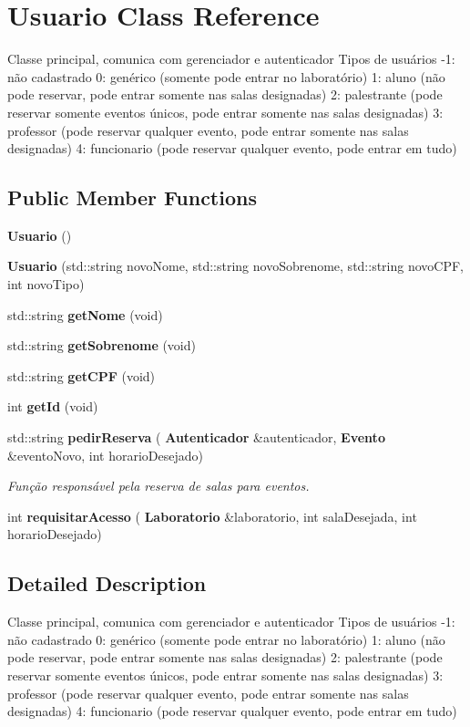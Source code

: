 \section{Usuario Class Reference}
\label{class_usuario}


Classe principal, comunica com gerenciador e autenticador Tipos de usuários -\/1\+: não cadastrado 0\+: genérico (somente pode entrar no laboratório) 1\+: aluno (não pode reservar, pode entrar somente nas salas designadas) 2\+: palestrante (pode reservar somente eventos únicos, pode entrar somente nas salas designadas) 3\+: professor (pode reservar qualquer evento, pode entrar somente nas salas designadas) 4\+: funcionario (pode reservar qualquer evento, pode entrar em tudo)  


\subsection*{Public Member Functions}
\begin{DoxyCompactItemize}
\item 
\textbf{ Usuario} ()
\item 
\textbf{ Usuario} (std\+::string novo\+Nome, std\+::string novo\+Sobrenome, std\+::string novo\+C\+PF, int novo\+Tipo)
\item 
std\+::string \textbf{ get\+Nome} (void)
\item 
std\+::string \textbf{ get\+Sobrenome} (void)
\item 
std\+::string \textbf{ get\+C\+PF} (void)
\item 
int \textbf{ get\+Id} (void)
\item 
std\+::string \textbf{ pedir\+Reserva} (\textbf{ Autenticador} \&autenticador, \textbf{ Evento} \&evento\+Novo, int horario\+Desejado)
\begin{DoxyCompactList}\small\item\em Função responsável pela reserva de salas para eventos. \end{DoxyCompactList}\item 
int \textbf{ requisitar\+Acesso} (\textbf{ Laboratorio} \&laboratorio, int sala\+Desejada, int horario\+Desejado)
\end{DoxyCompactItemize}


\subsection{Detailed Description}
Classe principal, comunica com gerenciador e autenticador Tipos de usuários -\/1\+: não cadastrado 0\+: genérico (somente pode entrar no laboratório) 1\+: aluno (não pode reservar, pode entrar somente nas salas designadas) 2\+: palestrante (pode reservar somente eventos únicos, pode entrar somente nas salas designadas) 3\+: professor (pode reservar qualquer evento, pode entrar somente nas salas designadas) 4\+: funcionario (pode reservar qualquer evento, pode entrar em tudo) 

